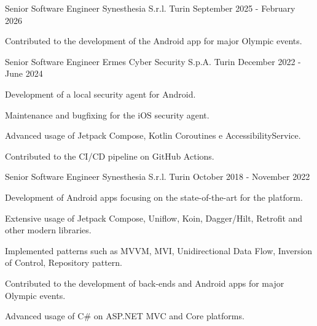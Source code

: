 

\begin{cventries}

\cventry
  {Senior Software Engineer} %
  {Synesthesia S.r.l.} %
  {Turin} %
  {September 2025 - February 2026} %
  {
    \begin{cvitems} %
      \item {Contributed to the development of the Android app for major Olympic events.}
    \end{cvitems}
  }

  \cventry
    {Senior Software Engineer} %
    {Ermes Cyber Security S.p.A.} %
    {Turin} %
    {December 2022 - June 2024} %
    {
      \begin{cvitems} %
        \item {Development of a local security agent for Android.}
        \item {Maintenance and bugfixing for the iOS security agent.}
        \item {Advanced usage of Jetpack Compose, Kotlin Coroutines e AccessibilityService.}
        \item {Contributed to the CI/CD pipeline on GitHub Actions.}
      \end{cvitems}
    }

  \cventry
    {Senior Software Engineer} %
    {Synesthesia S.r.l.} %
    {Turin} %
    {October 2018 - November 2022} %
    {
      \begin{cvitems} %
        \item {Development of Android apps focusing on the state-of-the-art for the platform.}
        \item {Extensive usage of Jetpack Compose, Uniflow, Koin, Dagger/Hilt, Retrofit and other modern libraries.}
        \item {Implemented patterns such as MVVM, MVI, Unidirectional Data Flow, Inversion of Control, Repository pattern.}
        \item {Contributed to the development of back-ends and Android apps for major Olympic events.}
        \item {Advanced usage of C\# on ASP.NET MVC and Core platforms.}
      \end{cvitems}
    }


\end{cventries}
